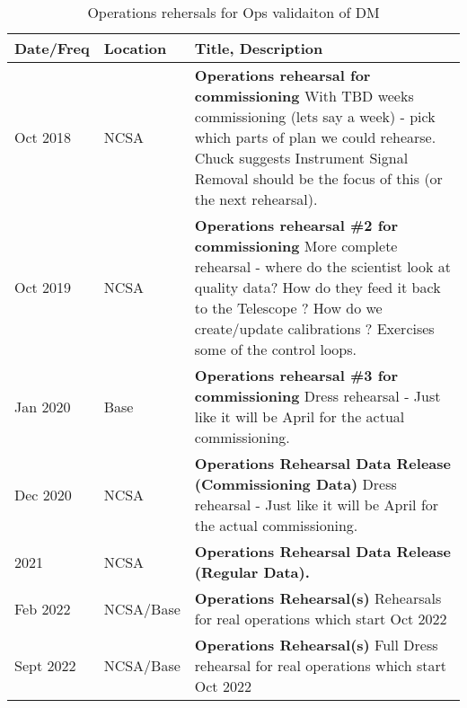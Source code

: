 \begin{longtable} {|l|l|p{}|} 
	\caption{Operations rehersals for Ops validaiton of DM \label{tab:ors}}\\  %
	\hline
{\bf Date/Freq} &{\bf Location}& {\bf Title, Description} \\ \hline

Oct 2018 &  NCSA & {\bf Operations rehearsal for commissioning }
	With TBD weeks commissioning (lets say a week) - pick which parts of plan we could rehearse.
	Chuck suggests Instrument Signal Removal should be the focus of this (or the next rehearsal).
	\\ \hline
Oct 2019 & NCSA &  {\bf  Operations rehearsal \#2 for commissioning} 
More complete rehearsal - where do the scientist look at quality data? How do they feed it back to the Telescope ?
How do we create/update calibrations ? Exercises some of the control loops.
\\ \hline
Jan 2020 & Base  &  {\bf  Operations rehearsal \#3 for commissioning} 
Dress rehearsal - Just like it will be April for the actual commissioning.
	\\ \hline
Dec 2020 &  NCSA &  {\bf Operations  Rehearsal Data Release (Commissioning Data)}
	Dress rehearsal - Just like it will be April for the actual commissioning.
	\\ \hline

2021 &  NCSA &  {\bf Operations  Rehearsal Data Release (Regular Data).}
	\\ \hline

Feb 2022 &  NCSA/Base &  {\bf Operations  Rehearsal(s)}
Rehearsals for real operations which start Oct 2022
	\\ \hline
Sept 2022 &  NCSA/Base &  {\bf Operations  Rehearsal(s)}
Full Dress rehearsal for real operations which start Oct 2022
	\\ \hline


\end{longtable}
